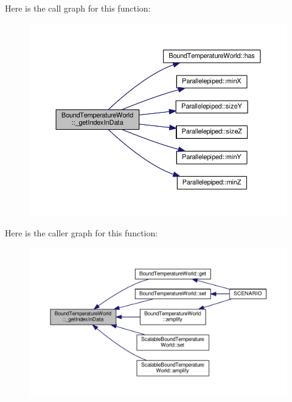 Here is the call graph for this function\-:
\nopagebreak
\begin{figure}[H]
\begin{center}
\leavevmode
\includegraphics[width=350pt]{class_bound_temperature_world_a6be6a48b1a29f0b1cc4a01b5e0369f9e_cgraph}
\end{center}
\end{figure}




Here is the caller graph for this function\-:
\nopagebreak
\begin{figure}[H]
\begin{center}
\leavevmode
\includegraphics[width=350pt]{class_bound_temperature_world_a6be6a48b1a29f0b1cc4a01b5e0369f9e_icgraph}
\end{center}
\end{figure}


